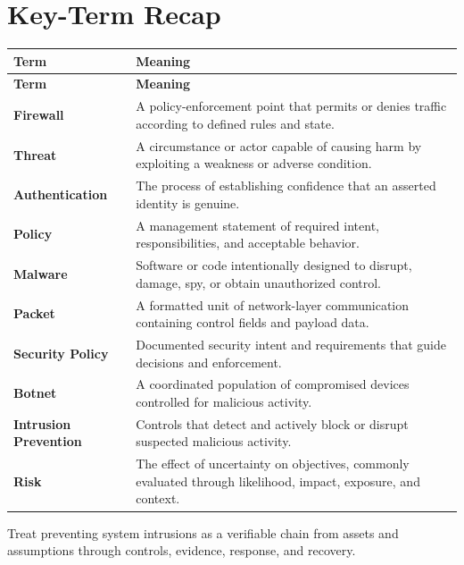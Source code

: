 \documentclass[11pt]{article}
\begin{document}
\section*{Key-Term Recap}
\begin{longtable}{>{\RaggedRight\arraybackslash}p{}>{\RaggedRight\arraybackslash}p{}}
\toprule\rowcolor{Navy}\color{white}\textbf{Term} & \color{white}\textbf{Meaning}\\\midrule
\endfirsthead
\toprule\rowcolor{Navy}\color{white}\textbf{Term} & \color{white}\textbf{Meaning}\\\midrule
\endhead
\textbf{Firewall} & A policy-enforcement point that permits or denies traffic according to defined rules and state. \\\midrule
\textbf{Threat} & A circumstance or actor capable of causing harm by exploiting a weakness or adverse condition. \\\midrule
\textbf{Authentication} & The process of establishing confidence that an asserted identity is genuine. \\\midrule
\textbf{Policy} & A management statement of required intent, responsibilities, and acceptable behavior. \\\midrule
\textbf{Malware} & Software or code intentionally designed to disrupt, damage, spy, or obtain unauthorized control. \\\midrule
\textbf{Packet} & A formatted unit of network-layer communication containing control fields and payload data. \\\midrule
\textbf{Security Policy} & Documented security intent and requirements that guide decisions and enforcement. \\\midrule
\textbf{Botnet} & A coordinated population of compromised devices controlled for malicious activity. \\\midrule
\textbf{Intrusion Prevention} & Controls that detect and actively block or disrupt suspected malicious activity. \\\midrule
\textbf{Risk} & The effect of uncertainty on objectives, commonly evaluated through likelihood, impact, exposure, and context. \\\midrule
\bottomrule
\end{longtable}
\begin{takeawaybox}
Treat preventing system intrusions as a verifiable chain from assets and assumptions through controls, evidence, response, and recovery.
\end{takeawaybox}
\end{document}
